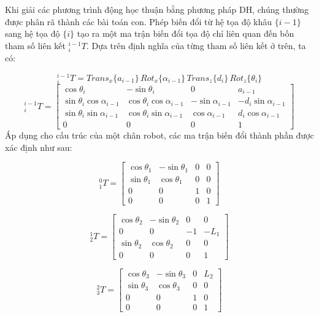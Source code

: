 Khi giải các phương trình động học thuận bằng phương pháp DH, chúng thường được 
phân rã thành các bài toán con. Phép biến đổi từ hệ tọa độ khâu $\{i-1\}$ sang hệ 
tọa độ $\{i\}$ tạo ra một ma trận biến đổi tọa độ chỉ liên quan đến bốn tham số 
liên kết $^{i-1}_{i}T$. Dựa trên định nghĩa của từng tham số liên kết ở trên, ta có:

\begin{equation}
^{i-1}_{i}T = Trans_x\{a_{i-1}\} \, Rot_x\{\alpha_{i-1}\} \, Trans_z\{d_i\} \, Rot_z\{\theta_i\}
\end{equation}
\begin{equation}
{}^{i-1}_{i}T=
\begin{bmatrix}
\cos\theta_i & -\sin\theta_i & 0 & a_{i-1} \\
\sin\theta_i\cos\alpha_{i-1} & \cos\theta_i\cos\alpha_{i-1} & -\sin\alpha_{i-1} & -d_i\sin\alpha_{i-1} \\
\sin\theta_i\sin\alpha_{i-1} & \cos\theta_i\sin\alpha_{i-1} & \cos\alpha_{i-1} & d_i\cos\alpha_{i-1} \\
0 & 0 & 0 & 1
\end{bmatrix}
\end{equation}
Áp dụng cho cấu trúc của một chân robot, các ma trận biến đổi thành phần được xác định như sau:

\begin{equation}
{}^{0}_{1}T=
\begin{bmatrix}
\cos\theta_1 & -\sin\theta_1 & 0 & 0 \\
\sin\theta_1 & \cos\theta_1 & 0 & 0 \\
0 & 0 & 1 & 0 \\
0 & 0 & 0 & 1
\end{bmatrix}
\end{equation}

\begin{equation}
{}^{1}_{2}T=
\begin{bmatrix}
\cos\theta_2 & -\sin\theta_2 & 0 & 0 \\
0 & 0 & -1 & -L_1 \\
\sin\theta_2 & \cos\theta_2 & 0 & 0 \\
0 & 0 & 0 & 1
\end{bmatrix}
\end{equation}

\begin{equation}
{}^{2}_{3}T=
\begin{bmatrix}
\cos\theta_3 & -\sin\theta_3 & 0 & L_2 \\
\sin\theta_3 & \cos\theta_3 & 0 & 0 \\
0 & 0 & 1 & 0 \\
0 & 0 & 0 & 1
\end{bmatrix}
\end{equation}

